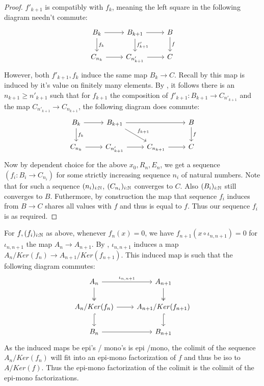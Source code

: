 \begin{proof}
  $f'_{k+1}$ is compatibly with $f_k$, meaning the left square in the following diagram needn't commute:
  \begin{equation}
    \begin{tikzcd}
      B_{k} \arrow[r] \arrow[d, "f_k"]& B_{{k+1}}  \arrow[r] \arrow[d,"f'_{k+1}"] & B \arrow[d,"f"] \\
      C_{n_k} \arrow[r] & C_{n'_{k+1}} \arrow[r]  & C 
    \end{tikzcd}
  \end{equation}
  However, both $f'_{k+1}, f_k$ induce the same map $B_{k} \to C$. 
  Recall by  this map is induced by it's value on finitely many elements. 
  By , it follows there is an $n_{k+1} \geq {n'_{k+1}}$ 
  such that for $f_{k+1}$ the composition of $f'_{k+1}:B_{k+1} \to C_{n'_{k+1}}$ and 
  the map $C_{n'_{k+1}} \to C_{n_{k+1}}$, the following diagram does commute:
  \begin{equation}
    \begin{tikzcd}
      B_{k} \arrow[d,"f_k"]\arrow[r] & B_{{k+1}} \arrow[rd, "f_{k+1}"] \arrow[rr] & & B \arrow[d,"f"] \\
      C_{n_k} \arrow[r] & C_{n'_{k+1}} \arrow[r] & C_{n_{k+1}} \arrow[r] & C 
    \end{tikzcd}
  \end{equation}
  Now by dependent choice for the above $x_0, R_n, E_n$, we get a sequence $(f_i:B_i \to C_{n_i})$  for some 
  strictly increasing sequence $n_i$ of natural numbers. 
  Note that for such a sequence $(n_i)_{i:\mathbb{N}}$, 
  $(C_{n_i})_{i:\mathbb{N}}$ converges to $C$. Also $(B_i)_{i:\mathbb{N}}$ still converges to $B$. 
  Futhermore, by construction the map that sequence $f_i$ induces from $B \to C$ shares all values with $f$
  and thus is equal to $f$. 
  Thus our sequence $f_i$ is as required. 
\end{proof}
\begin{remark}\label{rmkEpiMonoFactorizationCommutes}
  For $f,(f_i)_{i:\mathbb{N}}$ as above, whenever $f_n(x) = 0$, we have $f_{n+1}(x \circ \iota_{n,n+1}) = 0$
  for $\iota_{n,n+1}$ the map $A_n \to A_{n+1}$. 
  By , $\iota_{n,n+1}$ induces a map $A_n/Ker(f_n)\to A_{n+1}/Ker(f_{n+1})$. 
  This induced map is such that the following diagram commutes:
  \begin{equation}\begin{tikzcd}
    A_n \arrow[d, two heads] \arrow[r, "\iota_{n,n+1}"] & A_{n+1} \arrow[d,two heads]\\
    A_n /Ker(f_n) \arrow[d,hook] \arrow[r] & A_{n+1} /Ker(f_{n+1}) \arrow[d,hook] \\
    B_n \arrow[r] & B_{n+1}
  \end{tikzcd}\end{equation}  
  As the induced maps be epi's / mono's  is epi /mono, the colimit of the sequence 
  $A_n / Ker(f_n)$ will fit into an epi-mono factorization of $f$ and thus be iso to $A/Ker(f)$. 
  Thus the epi-mono factorization of the colimit is the colimit of the epi-mono factorizations. 
\end{remark}
